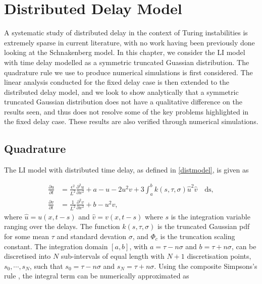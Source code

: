 \chapter{Distributed Delay Model}

A systematic study of distributed delay in the context of Turing instabilities is extremely sparse in current literature, with no work having been previously done looking at the Schnakenberg model. In this chapter, we consider the LI model with time delay modelled as a symmetric truncated Guassian distribution. The quadrature rule we use to produce numerical simulations is first considered. The linear analysis conducted for the fixed delay case is then extended to the distributed delay model, and we look to show analytically that a symmetric truncated Gaussian distribution does not have a qualitative difference on the results seen, and thus does not resolve some of the key problems highlighted in the fixed delay case. These results are also verified through numerical simulations.

\section{Quadrature}\label{section:quad}

The LI model with distributed time delay, as defined in \eqref{distmodel}, is given as

\begin{equation}\label{distmodel2}
  \begin{split}
    \frac{\partial u}{\partial t}&=\frac{\epsilon^2}{L^2}\frac{\partial^2u}{\partial x^2}+a-u-2u^2v+3\int_{a}^{b}k(s,\tau,\sigma)\hat{u}^2\hat{v} \quad\text{ds},\\
    \frac{\partial v}{\partial t}&=\frac{1}{L^2}\frac{\partial^2v}{\partial x^2}+b-u^2v,
\end{split}
\end{equation}
where $\hat{u}=u(x,t-s)$ and $\hat{v}=v(x,t-s)$ where $s$ is the integration variable ranging over the delays. The function $k(s,\tau,\sigma)$ is the truncated Gaussian pdf for some mean $\tau$ and standard devation $\sigma$, and $\Phi_c$ is the truncation scaling constant. The integration domain $[a, b]$, with $a=\tau-n\sigma$ and $b=\tau+n\sigma$, can be discretised into $N$ sub-intervals of equal length with $N+1$ discretisation points, $s_0,\cdots,s_{N}$, such that $s_0=\tau-n\sigma$ and $s_N=\tau+n\sigma$. Using the composite Simpsons's rule \cite{compsimp}, the integral term can be numerically approximated as


